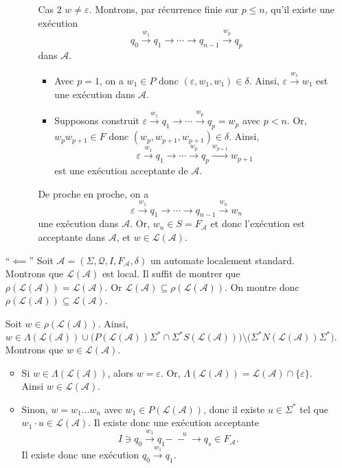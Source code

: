 \begin{prv}
\begin{itemize}
\begin{itemize}
\begin{itemize}
						\item[Cas 2] $w \neq \varepsilon$.
							Montrons, par récurrence finie sur $p \le n$, qu'il existe une exécution \[
								q_0 \xrightarrow{w_1}q_1\to \cdots \to q_{n-1}\xrightarrow{w_p} q_p
							\] dans $\mathcal{A}$.
							\begin{itemize}
								\item Avec $p = 1$, on a $w_1 \in P$\/ donc $(\varepsilon, w_1, w_1) \in \delta$. Ainsi, $\varepsilon \xrightarrow{w_1}w_1$\/ est une exécution dans $\mathcal{A}$.
								\item Supposons construit $\varepsilon \xrightarrow{w_1} q_1 \to \cdots \xrightarrow{w_p} q_p = w_p$\/ avec $p < n$.
									Or, $w_pw_{p+1} \in F$\/ donc $(w_p, w_{p+1}, w_{p+1}) \in \delta$. Ainsi, \[
										\varepsilon \xrightarrow{w_1} q_1 \to \cdots \xrightarrow{w_p} q_p \xrightarrow{w_{p+1}} w_{p+1}
									\] est une exécution acceptante de $\mathcal{A}$.
							\end{itemize}
							De proche en proche, on a \[
								\varepsilon \xrightarrow{w_1} q_1 \to \cdots \to q_{n-1} \xrightarrow{w_{n}} w_{n}
							\] une exécution dans $\mathcal{A}$. Or, $w_n \in S = F_\mathcal{A}$\/ et donc l'exécution est acceptante dans $\mathcal{A}$, et $w \in \mathcal{L}(\mathcal{A})$.
					\end{itemize}
			\end{itemize}
		\item[``$\impliedby$'']
			Soit $\mathcal{A} = (\Sigma, \mathcal{Q}, I, F_\mathcal{A}, \delta)$\/ un automate localement standard.
			Montrons que $\mathcal{L}(\mathcal{A})$\/ est local. Il suffit de montrer que $\rho(\mathcal{L}(\mathcal{A})) = \mathcal{L}(\mathcal{A})$. Or $\mathcal{L}(\mathcal{A}) \subseteq \rho(\mathcal{L}(\mathcal{A}))$. On montre donc $\rho(\mathcal{L}(\mathcal{A}))\subseteq \mathcal{L}(\mathcal{A})$.

			Soit $w \in \rho(\mathcal{L}(\mathcal{A}))$. Ainsi, \[
				w \in \Lambda(\mathcal{L}(\mathcal{A})) \cup \Big(P(\mathcal{L}(\mathcal{A})) \Sigma^* \cap \Sigma^* S(\mathcal{L}(\mathcal{A}))\Big) \setminus \Big(\Sigma^* N(\mathcal{L}(\mathcal{A}))\Sigma^*\Big)
			.\]
			Montrons que $w \in \mathcal{L}(\mathcal{A})$.
			\begin{itemize}
				\item Si $w \in \Lambda(\mathcal{L}(\mathcal{A}))$, alors $w = \varepsilon$. Or, $\Lambda(\mathcal{L}(\mathcal{A})) = \mathcal{L}(\mathcal{A}) \cap \{\varepsilon\}$. Ainsi $w \in \mathcal{L}(\mathcal{A})$.
				\item Sinon, $w = w_1\ldots w_n$\/ avec $w_1 \in P(\mathcal{L}(\mathcal{A}))$, donc il existe $u \in \Sigma^*$\/ tel que $w_1\cdot u \in \mathcal{L}(\mathcal{A})$. Il existe donc une exécution acceptante \[ %
						I \ni q_0 \xrightarrow{w_1} q_1 \overset{u}{-\ -\ \to} q_s \in F_\mathcal{A}
					.\]
					Il existe donc une exécution $q_0\xrightarrow{w_1}q_1$.


\end{itemize}
\end{itemize}
\end{prv}

